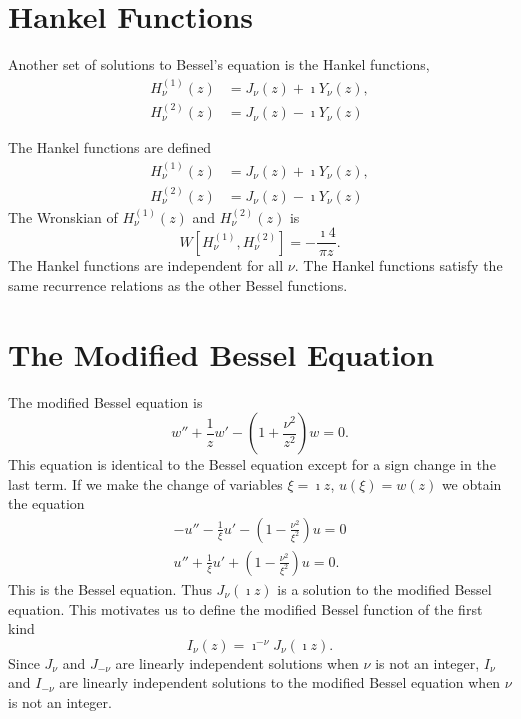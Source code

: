 \section{Hankel Functions}


Another set of solutions to Bessel's equation is the Hankel functions,
\begin{align*}
  H_\nu^{(1)}(z) &= J_\nu(z) + \imath Y_\nu(z), 
  \\
  H_\nu^{(2)}(z) &= J_\nu(z) - \imath Y_\nu(z) 
\end{align*}



\begin{Result}
  The Hankel functions are defined
  \begin{align*}
    H_\nu^{(1)}(z) &= J_\nu(z) + \imath Y_\nu(z), 
    \\
    H_\nu^{(2)}(z) &= J_\nu(z) - \imath Y_\nu(z) 
  \end{align*}
  The Wronskian of $H_\nu^{(1)}(z)$ and $H_\nu^{(2)}(z)$ is
  \[ 
  W[H_\nu^{(1)}, H_\nu^{(2)}] = - \frac{\imath 4}{\pi z}. 
  \]
  The Hankel functions are independent for all $\nu$.
  The Hankel functions satisfy the same recurrence relations as the other
  Bessel functions.
\end{Result}









\section{The Modified Bessel Equation}





The modified Bessel equation is
\[ 
w'' + \frac{1}{z} w' - \left(1 + \frac{\nu^2}{z^2} \right) w = 0. 
\]
This equation is identical to the Bessel equation except for a sign change
in the last term.  If we make the change of variables $\xi = \imath z$, 
$u(\xi) = w(z)$ we obtain the equation
\begin{gather*}
  -u'' - \frac{1}{\xi} u' - \left(1 - \frac{\nu^2}{\xi^2} \right) u = 0 
  \\
  u'' + \frac{1}{\xi} u' + \left(1 - \frac{\nu^2}{\xi^2} \right) u = 0.
\end{gather*}
This is the Bessel equation.  Thus $J_\nu(\imath z)$ is a solution to the modified
Bessel equation.  This motivates us to define the modified Bessel function
of the first kind
\[ 
I_\nu(z) = \imath^{-\nu} J_\nu(\imath z). 
\]
Since $J_\nu$ and $J_{-\nu}$ are linearly independent solutions when $\nu$ is not
an integer, $I_\nu$ and $I_{-\nu}$ are linearly independent solutions 
to the modified Bessel equation when $\nu$ is not an integer.


